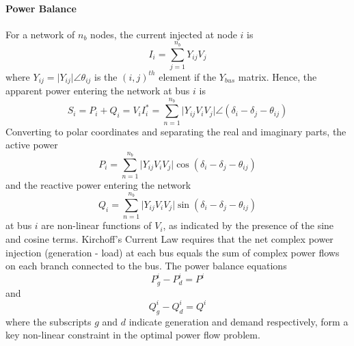 \paragraph{Power Balance}
For a network of $n_b$ nodes, the current injected at
node $i$ is
\begin{equation}
I_i = \sum_{j=1}^{n_b} Y_{ij} V_j
\end{equation}
where $Y_{ij} = \vert Y_{ij}\vert \angle\theta_{ij}$ is the $(i,j)^{th}$ element
if the $Y_{bus}$ matrix.  Hence, the apparent power entering
the network at bus $i$ is
\begin{equation}
S_i = P_i+Q_i = V_iI_i^* = \sum_{n=1}^{n_b} \vert Y_{ij}V_iV_j \vert \angle
(\delta_i - \delta_j - \theta_{ij})
\end{equation}
Converting to polar coordinates and separating the real and imaginary parts,
the active power
\begin{equation}
P_i = \sum_{n=1}^{n_b} \vert Y_{ij}V_iV_j \vert \cos(\delta_i - \delta_j -
\theta_{ij})
\end{equation}
and the reactive power entering the network
\begin{equation}
Q_i = \sum_{n=1}^{n_b} \vert Y_{ij}V_iV_j \vert \sin(\delta_i - \delta_j -
\theta_{ij})
\end{equation}
at bus $i$ are non-linear functions of $V_i$, as indicated by the presence of
the sine and cosine terms.  Kirchoff's Current Law requires that the net
complex power injection (generation - load) at each bus equals the sum of
complex power flows on each branch connected to the bus.  The power balance
equations
\begin{equation}
\label{eq:p_balance}
P_g^i - P_d^i = P^i
\end{equation}
and
\begin{equation}
\label{eq:q_balance}
Q_g^i - Q_d^i = Q^i
\end{equation}
where the subscripts $g$ and $d$ indicate generation and demand
respectively, form a key non-linear constraint in the optimal power flow
problem.

